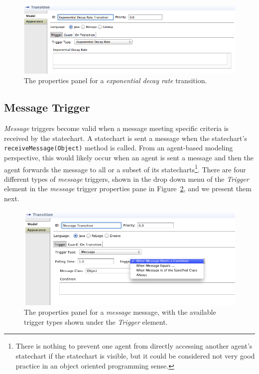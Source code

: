 \documentclass[11pt]{amsart}
\begin{document}
\begin{figure}
\begin{center}
\vspace{.2in}
\centerline {
\includegraphics[width=5in]{StatechartsImages/ExponentialTransitionProperties.png}
}
\caption{The properties panel for a \emph{exponential decay rate} transition.}
\label{fig:exponentialTransitionProperties}
\end{center}
\end{figure}
\clearpage



\subsection{Message Trigger}
\label{sec:messageTransition}
\emph{Message} triggers become valid when a message meeting specific criteria is received by the statechart. A statechart is sent a message when the statechart's \texttt{receiveMessage(Object)} method is called. From an agent-based modeling perspective, this would likely occur when an agent is sent a message and then the agent forwards the message to all or a subset of its statecharts\footnote{There is nothing to prevent one agent from directly accessing another agent's statechart if the statechart is visible, but it could be considered not very good practice in an object oriented programming sense.}. There are four different types of \emph{message} triggers, shown in the drop down menu of the \emph{Trigger} element in the \emph{message} trigger properties pane in Figure~\ref{fig:messageTransitionProperties}, and we present them next.

\begin{figure}
\begin{center}
\vspace{.2in}
\centerline {
\includegraphics[width=5in]{StatechartsImages/MessageTransitionProperties.png}
}
\caption{The properties panel for a \emph{message} message, with the available trigger types shown under the \emph{Trigger} element.}
\label{fig:messageTransitionProperties}
\end{center}
\end{figure}
\clearpage
\end{document}
